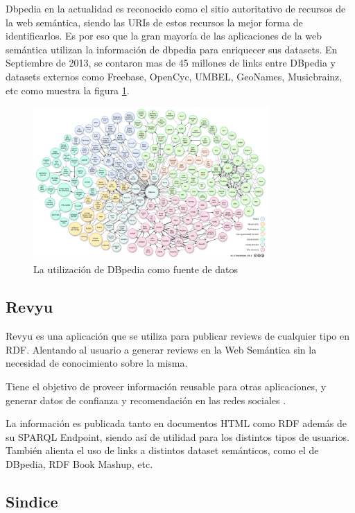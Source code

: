 Dbpedia en la actualidad es reconocido como el sitio autoritativo de recursos de la web semántica, siendo las URIs de estos recursos 
la mejor forma de identificarlos.
Es por eso que la gran mayoría de las aplicaciones de la web semántica utilizan la información de dbpedia para enriquecer sus datasets.
En Septiembre de 2013, se contaron mas de 45 millones de links entre DBpedia y datasets externos como  Freebase, OpenCyc, UMBEL, GeoNames,
Musicbrainz, etc como muestra la figura \ref{figure:dbpedia}.

\begin{figure}
    \centering
    \includegraphics[width=0.8\textwidth,natwidth=610,natheight=642]{dbpedia}
    \caption{La utilización de DBpedia como fuente de datos}
    \label{figure:dbpedia}
\end{figure}

\subsection{Revyu}

Revyu es una aplicación que se utiliza para publicar reviews de cualquier tipo en RDF. Alentando al usuario a generar reviews en la Web Semántica 
sin la necesidad de conocimiento sobre la misma.

Tiene el objetivo de proveer información reusable para otras aplicaciones, y generar datos de confianza y recomendación en las redes sociales \cite{Heath}.

La información es publicada tanto en documentos HTML como RDF además de su SPARQL Endpoint, siendo así de utilidad para los distintos tipos de usuarios.
También alienta el uso de links a distintos dataset semánticos, como el de DBpedia, RDF Book Mashup, etc.

\subsection{Sindice} 


